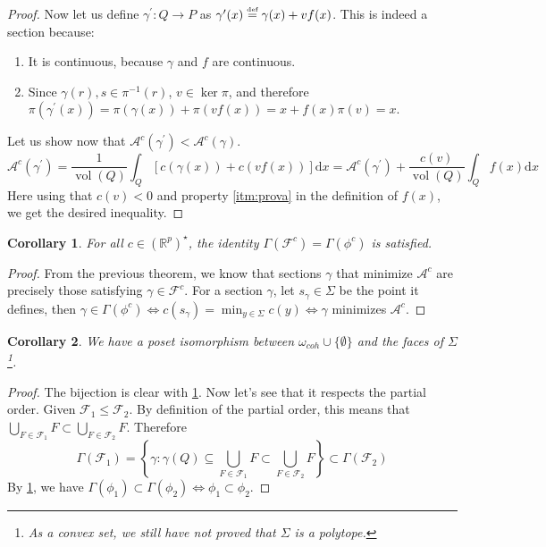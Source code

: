 \documentclass[10pt,a4paper]{article}
\DeclareMathOperator{\vol}{vol}
\def\defs{\stackrel{\tiny{\mbox{def}}}{=}}		%
\newcommand{\RR}{\mathbb{R}}
\theoremstyle{plain}
\newtheorem{corollary}{Corollary}
\theoremstyle{remark}
\theoremstyle{definition}
\begin{document}
\begin{proof}
        Now let us define $\gamma^\prime\colon Q\to P$ as
        $\gamma^\prime(x) \defs \gamma(x) + vf(x)$.
        This is indeed a section because:
        \begin{enumerate}
            \item It is continuous, because $\gamma$ and $f$ are continuous.
            \item Since $\gamma(r),s\in \pi^{-1}(r)$, $v\in \ker \pi$, 
            and therefore 
            $\pi(\gamma^\prime(x)) = \pi(\gamma(x)) + \pi(vf(x)) = x + f(x)\pi(v) = x$. 
        \end{enumerate}
        
        Let us show now that $\mathcal{A}^c(\gamma^\prime) < \mathcal{A}^c(\gamma)$.
        \begin{equation}
        \mathcal{A}^c(\gamma^\prime) = 
        \frac1{\vol(Q)} \int_Q \left[c(\gamma(x)) + c(vf(x)) \right]\mathrm{ d}x = 
        \mathcal{A}^c(\gamma^\prime)  + \frac{c(v)}{\vol(Q)}\int_Q f(x)\mathrm{ d}x 
        \end{equation}
        Here using that $c(v) < 0$ and property \ref{itm:prova} in the definition of $f(x)$, 
        we get the desired inequality.
    \end{proof}
    
    \begin{corollary}
        \label{cor:gammaEquality}
        For all $c\in(\RR^p)^\star$, the identity $\Gamma(\mathcal{F}^c) = \Gamma(\phi^c)$ is satisfied.
    \end{corollary}
    \begin{proof}
        From the previous theorem, 
        we know that sections $\gamma$ that minimize $\mathcal A^c$ are precisely those satisfying $\gamma\in\mathcal{F}^c$. 
        For a section $\gamma$, let $s_\gamma\in\Sigma$ be the point it defines, 
        then $\gamma\in \Gamma(\phi^c) \iff c(s_\gamma) = \min_{y\in \Sigma}c(y) \iff \gamma$ minimizes $\mathcal{A}^c$.
    \end{proof}
    \begin{corollary}
        We have a poset isomorphism between $\omega_{coh}\cup \{\emptyset\}$ and the faces of $\Sigma$
        \footnote{As a convex set, we still have not proved that $\Sigma$ is a polytope.}.
    \end{corollary}
    \begin{proof}
        The bijection is clear with \cref{cor:gammaEquality}.
        Now let's see that it respects the partial order.
        Given $\mathcal{F}_1 \leq \mathcal{F}_2$. 
        By definition of the partial order, this means that 
        $\bigcup_{F\in\mathcal{F}_1} F \subset \bigcup_{F\in\mathcal{F}_2} F$.
        Therefore
        \begin{equation}
        \Gamma(\mathcal{F}_1) = \left\{ \gamma : \gamma(Q) \subseteq \bigcup_{F\in\mathcal{F}_1} F \subset \bigcup_{F\in\mathcal{F}_2} F \right\} 
        \subset  \Gamma(\mathcal{F}_2)
        \end{equation} 
        By \cref{cor:gammaEquality}, we have 
        $\Gamma(\phi_1) \subset \Gamma(\phi_2) \iff \phi_1 \subset \phi_2$.
        
    \end{proof}
    
\end{document}
